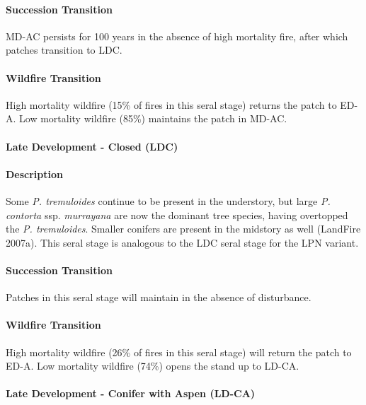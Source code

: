 \paragraph{Succession Transition} MD-AC persists for 100 years in the absence of high mortality fire, after which patches transition to LDC. 

\paragraph{Wildfire Transition} High mortality wildfire (15\% of fires in this seral stage) returns the patch to ED-A. Low mortality wildfire (85\%) maintains the patch in MD-AC.

\noindent\hrulefill

\paragraph{Late Development - Closed (LDC)}

\paragraph{Description} Some \emph{P. tremuloides} continue to be present in the understory, but large\emph{ P. contorta} ssp. \emph{murrayana} are now the dominant tree species, having overtopped the \emph{P. tremuloides}. Smaller conifers are present in the midstory as well (LandFire 2007a). This seral stage is analogous to the LDC seral stage for the LPN variant.

\paragraph{Succession Transition} Patches in this seral stage will maintain in the absence of disturbance.

\paragraph{Wildfire Transition} High mortality wildfire (26\% of fires in this seral stage) will return the patch to ED-A. Low mortality wildfire (74\%) opens the stand up to LD-CA.

\noindent\hrulefill


\paragraph{Late Development - Conifer with Aspen (LD-CA)}

